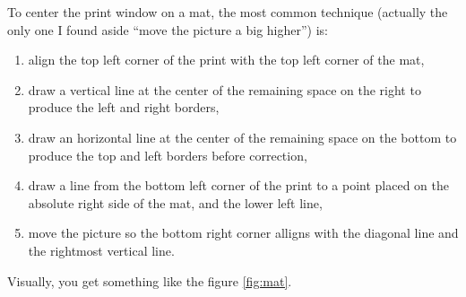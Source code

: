 \documentclass[
    paper=letter,
    parskip=half-,
    DIV=10,
]{scrartcl}
\begin{document}
    To center the print window on a mat, the most common technique (actually the only one I found aside “move the picture a big higher”) is:

    \begin{enumerate}
        \item align the top left corner of the print with the top left corner of the mat,
        \item draw a vertical line at the center of the remaining space on the right to produce the left and right borders,
        \item draw an horizontal line at the center of the remaining space on the bottom to produce the top and left borders before correction,
        \item draw a line from the bottom left corner of the print to a point placed on the absolute right side of the mat, and the lower left line,
        \item move the picture so the bottom right corner alligns with the diagonal line and the rightmost vertical line.
    \end{enumerate}

    Visually, you get something like the figure \ref{fig:mat}.
\end{document}
